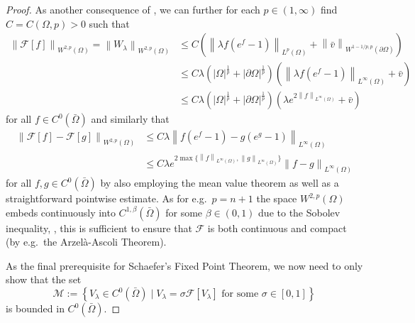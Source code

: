 \documentclass[12pt,a4paper]{amsart}
\theoremstyle{definition}
\theoremstyle{remark}
\numberwithin{equation}{section}
\numberwithin{theorem}{section}
\newcommand{\normA}[2][]{\left\lVert #2 \right\rVert_{#1}}
\begin{document}
\begin{proof}
As another consequence of \cite[Theorem 2.4.2.7]{Grisvard}, we can further for each $p\in(1,\infty)$ find $C = C(\Omega,p) > 0$ such that
\begin{equation*}
\begin{aligned}
\normA[W^{2,p}(\Omega)]{\mathcal{F}[f]} = \normA[W^{2,p}(\Omega)]{W_{\lambda}}&\leq  C\left(\normA[L^{p}(\Omega)]{\lambda f(e^f-1)}+\normA[W^{1-1/p,p}(\partial\Omega)]{\bar{v}}\right)\\
&\leq C\lambda(|\Omega|^\frac{1}{p} + |\partial\Omega|^\frac{1}{p})\left(\normA[L^{\infty}(\Omega)]{\lambda f(e^f-1)}+\bar{v}\right)\\
&\leq C\lambda(|\Omega|^\frac{1}{p} + |\partial\Omega|^\frac{1}{p})\left(\lambda e^{2\normA[L^{\infty}(\Omega)]{f}}+\bar{v}\right)
\end{aligned}  
\end{equation*}
for all $f \in C^0(\bar\Omega)$ and similarly that
\begin{equation*}
\begin{aligned}
\normA[W^{2,p}(\Omega)]{\mathcal{F}[f]-\mathcal{F}[g]}&\leq C\lambda\normA[L^{\infty}(\Omega)]{ f(e^{f}-1)-g(e^g-1)} \\
&\leq C\lambda e^{2\max\{\normA[L^{\infty}(\Omega)]{f}, \normA[L^{\infty}(\Omega)]{g}\}} \normA[L^{\infty}(\Omega)]{ f - g } 
\end{aligned}
\end{equation*}
for all $f,g \in C^0(\bar\Omega)$ by also employing the mean value theorem as well as a straightforward pointwise estimate. As for e.g.\ $p = n+1$ the space $W^{2,p}(\Omega)$ embeds continuously into $C^{1,\beta}(\bar\Omega)$ for some $\beta \in (0,1)$ due to the Sobolev inequality, \cite[Section 5.6.3]{Evans}, this is sufficient to ensure that $\mathcal{F}$ is both continuous and compact (by e.g.\ the Arzelà-Ascoli Theorem).

As the final prerequisite for Schaefer's Fixed Point Theorem, we now need to only show that the set 
$$
   \mathcal{M} := \left\{  V_{\lambda} \in C^0(\bar\Omega) \;|\; V_{\lambda} = \sigma\mathcal{F}[  V_{\lambda} ] \text{ for some } \sigma \in [0,1] \right\}
$$
is bounded in $C^0(\bar{\Omega})$. 


\end{proof}
\end{document}
